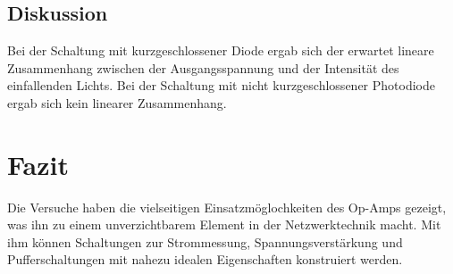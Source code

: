 \documentclass[12pt,a4paper]{article}
\begin{document}
\subsection{Diskussion}

Bei der Schaltung mit kurzgeschlossener Diode ergab sich der erwartet lineare Zusammenhang zwischen der Ausgangsspannung und der Intensität des einfallenden Lichts. Bei der Schaltung mit nicht kurzgeschlossener Photodiode ergab sich kein linearer Zusammenhang.

\section{Fazit}
Die Versuche haben die vielseitigen Einsatzmöglochkeiten des Op-Amps gezeigt, was ihn zu einem unverzichtbarem Element in der Netzwerktechnik macht. Mit ihm können Schaltungen zur Strommessung, Spannungsverstärkung und Pufferschaltungen mit nahezu idealen Eigenschaften konstruiert werden.
\end{document}

